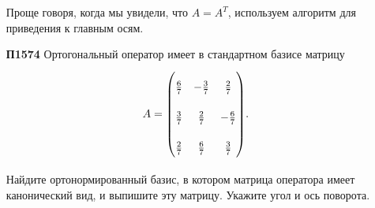 \documentclass[a4paper]{article}
\begin{document}
\begin{enumerate}
\begin{solution}
            Проще говоря, когда мы увидели, что $A = A^T$, используем алгоритм для приведения к главным осям.
        \end{solution}
    
    \item[\textbf{П1574}]
        Ортогональный оператор имеет в стандартном базисе матрицу
        \begin{equation*}
            A = {\renewcommand{\arraystretch}{2.3}\begin{pmatrix}
                \frac{6}{7} & -\frac{3}{7} & \frac{2}{7} \\
                \frac{3}{7} & \frac{2}{7} & -\frac{6}{7} \\
                \frac{2}{7} & \frac{6}{7} & \frac{3}{7} \\
            \end{pmatrix}}.
        \end{equation*}

        Найдите ортонормированный базис, в котором матрица оператора имеет канонический вид, и выпишите эту матрицу. Укажите угол и ось поворота.


\end{enumerate}
\end{document}
